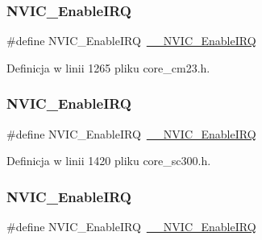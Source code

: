 \subsubsection{\texorpdfstring{N\+V\+I\+C\+\_\+\+Enable\+I\+RQ}{NVIC\_EnableIRQ}\hspace{0.1cm}{\footnotesize\ttfamily [6/12]}}
{\footnotesize\ttfamily \#define N\+V\+I\+C\+\_\+\+Enable\+I\+RQ~\hyperlink{group___c_m_s_i_s___core___n_v_i_c_functions_ga71227e1376cde11eda03fcb62f1b33ea}{\+\_\+\+\_\+\+N\+V\+I\+C\+\_\+\+Enable\+I\+RQ}}



Definicja w linii 1265 pliku core\+\_\+cm23.\+h.

\mbox{\label{group___c_m_s_i_s___core___n_v_i_c_functions_ga57b3064413dbc7459d9646020fdd8bef}} 
\subsubsection{\texorpdfstring{N\+V\+I\+C\+\_\+\+Enable\+I\+RQ}{NVIC\_EnableIRQ}\hspace{0.1cm}{\footnotesize\ttfamily [7/12]}}
{\footnotesize\ttfamily \#define N\+V\+I\+C\+\_\+\+Enable\+I\+RQ~\hyperlink{group___c_m_s_i_s___core___n_v_i_c_functions_ga71227e1376cde11eda03fcb62f1b33ea}{\+\_\+\+\_\+\+N\+V\+I\+C\+\_\+\+Enable\+I\+RQ}}



Definicja w linii 1420 pliku core\+\_\+sc300.\+h.

\mbox{\label{group___c_m_s_i_s___core___n_v_i_c_functions_ga57b3064413dbc7459d9646020fdd8bef}} 
\subsubsection{\texorpdfstring{N\+V\+I\+C\+\_\+\+Enable\+I\+RQ}{NVIC\_EnableIRQ}\hspace{0.1cm}{\footnotesize\ttfamily [8/12]}}
{\footnotesize\ttfamily \#define N\+V\+I\+C\+\_\+\+Enable\+I\+RQ~\hyperlink{group___c_m_s_i_s___core___n_v_i_c_functions_ga71227e1376cde11eda03fcb62f1b33ea}{\+\_\+\+\_\+\+N\+V\+I\+C\+\_\+\+Enable\+I\+RQ}}



